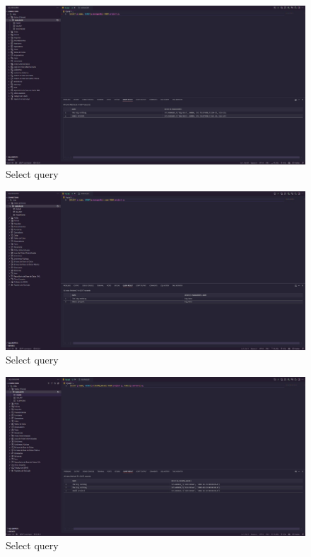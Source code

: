 \documentclass{article}
\begin{document}
\begin{figure}[H]
	\centering
	\includegraphics[width=1\textwidth]{imgs/sel4.jpeg}
	\caption{Select query}
	\label{fig:17}
\end{figure}

\begin{figure}[H]
	\centering
	\includegraphics[width=1\textwidth]{imgs/sel5.jpeg}
	\caption{Select query}
	\label{fig:18}
\end{figure}

\begin{figure}[H]
	\centering
	\includegraphics[width=1\textwidth]{imgs/sel6.jpeg}
	\caption{Select query}
	\label{fig:19}
\end{figure}
\end{document}
